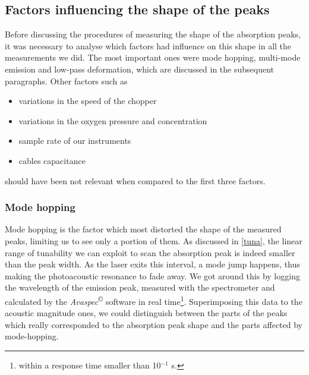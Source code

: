 \subsection{Factors influencing the shape of the peaks}\label{factorshape}
Before discussing the procedures of measuring the shape of the absorption peaks, it was necessary to analyse which factors had influence on this shape in all the measurements we did. The most important ones were mode hopping, multi-mode emission and low-pass deformation, which are discussed in the subsequent paragraphs. Other factors such as
\begin{itemize}
\item variations in the speed of the chopper
\item variations in the oxygen pressure and concentration
\item sample rate of our instruments
\item cables capacitance 
\end{itemize}
should have been not relevant when compared to the first three factors.

\subsubsection{Mode hopping} 
Mode hopping is the factor which most distorted the shape of the measured peaks, limiting us to see only a portion of them. As discussed in \cref{tuna}, the linear range of tunability we can exploit to scan the absorption peak is indeed smaller than the peak width. As the laser exits this interval, a mode jump happens, thus making the photoacoustic resonance to fade away. We got around this by logging the wavelength of the emission peak, measured with the spectrometer and calculated by the \textit{Avaspec}\textsuperscript{\copyright} software in real time\footnote{within a response time smaller than 10$^{-1}$ s.}. Superimposing this data to the acoustic magnitude ones, we could distinguish between the parts of the peaks which really corresponded to the absorption peak shape and the parts affected by mode-hopping.

